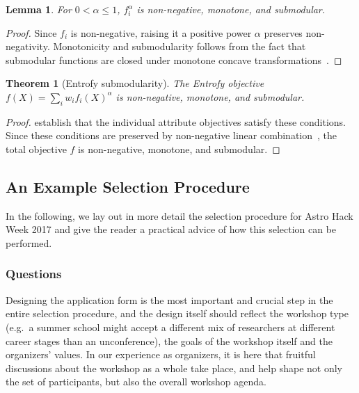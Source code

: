 \documentclass[12pt]{article}
\newtheorem{lemma}{Lemma}
\newtheorem{theorem}{Theorem}
\begin{document}
\begin{lemma}
    For $0 < \alpha \leq 1$, $f_i^\alpha$ is non-negative, monotone, and submodular.\label{lem:compress}
\end{lemma}
\begin{proof}
    Since $f_i$ is non-negative, raising it a positive power $\alpha$ preserves non-negativity.
    Monotonicity and submodularity follows from the fact that submodular functions are closed under monotone concave transformations~\cite[Theorem 1]{lin2011class}.
\end{proof}

\begin{theorem}[Entrofy submodularity]
The Entrofy objective ${f(X)=\sum_i w_i {f_i(X)}^\alpha}$ is non-negative, monotone, and submodular.
\end{theorem}
\begin{proof}
     establish that the individual attribute objectives satisfy these conditions.
    Since these conditions are preserved by non-negative linear combination~\cite[Section 2.1]{bach2013learning}, the total objective $f$ is non-negative, monotone, and submodular.
\end{proof}

\clearpage

\subsection*{An Example Selection Procedure}

In the following, we lay out in more detail the selection procedure for Astro Hack Week 2017 and give the reader a practical advice of how this selection can be performed.

\subsubsection*{Questions}

Designing the application form is the most important and crucial step in the entire selection procedure, and the design itself should reflect the workshop type (e.g.\ a summer school might accept a different mix of researchers at different career stages than an unconference), the goals of the workshop itself and the organizers' values. In our experience as organizers, it is here that fruitful discussions about the workshop as a whole take place, and help shape not only the set of participants, but also the overall workshop agenda. 
\end{document}
